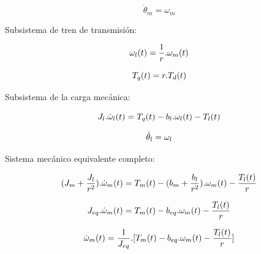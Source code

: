 \documentclass{article}
\begin{document}
\begin{equation}
    \label{eq:1.2}
    \dot{\theta}_{m} = \omega_{m}
\end{equation}

Subsistema de tren de transmisión:

\begin{equation}
    \label{eq:2.1}
    \omega_{l}(t) = \frac{1}{r}.\omega_{m}(t) \\
\end{equation}

\begin{equation}
    \label{eq:2.2}
    T_{q}(t) = r.T_{d}(t) \\
\end{equation}

Subsistema de la carga mecánica:

\begin{equation}
    \label{eq:3.1}
    J_{l}.\dot{\omega}_{l}(t) = T_{q}(t)-b_{l}.\omega_{l}(t)-T_{l}(t) \\
\end{equation}

\begin{equation}
    \label{eq:3.2}
    \dot{\theta}_{l} = \omega_{l}\\
\end{equation}

Sistema mecánico equivalente completo:

\begin{equation}
    \label{eq:4.1}
    (J_{m}+\frac{J_l}{r^2}).\dot{\omega}_{m}(t) = T_{m}(t)-(b_{m}+\frac{b_{l}}{r^2}).\omega_{m}(t)-\frac{T_{l}(t)}{r} \\
\end{equation}

\begin{equation}
    J_{eq}.\dot{\omega}_{m}(t) = T_{m}(t)-b_{eq}.\omega_{m}(t)-\frac{T_{l}(t)}{r} \\
\end{equation}

\begin{equation}
    \dot{\omega}_{m}(t) = \frac{1}{J_{eq}}.[T_{m}(t) - b_{eq}.\omega_{m}(t) - \frac{T_{l}(t)}{r}]\\
\end{equation}
\end{document}
